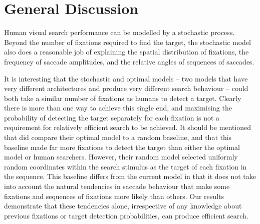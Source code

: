 \documentclass[man]{apa6}
\begin{document}
\section{General Discussion}

Human visual search performance can be modelled by a stochastic process. Beyond the number of fixations required to find the target, the stochastic model also does a reasonable job of explaining the spatial distribution of fixations, the frequency of saccade amplitudes, and the relative angles of sequences of saccades. 

It is interesting that the stochastic and optimal models -- two models that have very different architectures and produce very different search behaviour -- could both take a similar number of fixations as humans to detect a target. Clearly there is more than one way to achieve this single end, and maximising the probability of detecting the target separately for each fixation is not a requirement for relatively efficient search to be achieved. It should be mentioned that  \textcite{najemnik-geisler2005} did compare their optimal model to a random baseline, and that this baseline made far more fixations to detect the target than either the optimal model or human searchers. However, their random model selected uniformly random coordinates within the search stimulus as the target of each fixation in the sequence. This baseline differs from the current model in that it does not take into account the natural tendencies in saccade behaviour that make some fixations and sequences of fixations more likely than others. Our results demonstrate that these tendencies alone, irrespective of any knowledge about previous fixations or target detection probabilities, can produce efficient search. 


\par
\end{document}

